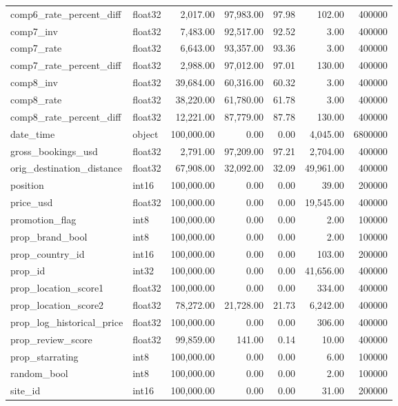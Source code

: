 \begin{table}
\begin{tabular}{llrrrrr}
comp6\_rate\_percent\_diff & float32 & 2,017.00 & 97,983.00 & 97.98 & 102.00 & 400000 \\
comp7\_inv & float32 & 7,483.00 & 92,517.00 & 92.52 & 3.00 & 400000 \\
comp7\_rate & float32 & 6,643.00 & 93,357.00 & 93.36 & 3.00 & 400000 \\
comp7\_rate\_percent\_diff & float32 & 2,988.00 & 97,012.00 & 97.01 & 130.00 & 400000 \\
comp8\_inv & float32 & 39,684.00 & 60,316.00 & 60.32 & 3.00 & 400000 \\
comp8\_rate & float32 & 38,220.00 & 61,780.00 & 61.78 & 3.00 & 400000 \\
comp8\_rate\_percent\_diff & float32 & 12,221.00 & 87,779.00 & 87.78 & 130.00 & 400000 \\
date\_time & object & 100,000.00 & 0.00 & 0.00 & 4,045.00 & 6800000 \\
gross\_bookings\_usd & float32 & 2,791.00 & 97,209.00 & 97.21 & 2,704.00 & 400000 \\
orig\_destination\_distance & float32 & 67,908.00 & 32,092.00 & 32.09 & 49,961.00 & 400000 \\
position & int16 & 100,000.00 & 0.00 & 0.00 & 39.00 & 200000 \\
price\_usd & float32 & 100,000.00 & 0.00 & 0.00 & 19,545.00 & 400000 \\
promotion\_flag & int8 & 100,000.00 & 0.00 & 0.00 & 2.00 & 100000 \\
prop\_brand\_bool & int8 & 100,000.00 & 0.00 & 0.00 & 2.00 & 100000 \\
prop\_country\_id & int16 & 100,000.00 & 0.00 & 0.00 & 103.00 & 200000 \\
prop\_id & int32 & 100,000.00 & 0.00 & 0.00 & 41,656.00 & 400000 \\
prop\_location\_score1 & float32 & 100,000.00 & 0.00 & 0.00 & 334.00 & 400000 \\
prop\_location\_score2 & float32 & 78,272.00 & 21,728.00 & 21.73 & 6,242.00 & 400000 \\
prop\_log\_historical\_price & float32 & 100,000.00 & 0.00 & 0.00 & 306.00 & 400000 \\
prop\_review\_score & float32 & 99,859.00 & 141.00 & 0.14 & 10.00 & 400000 \\
prop\_starrating & int8 & 100,000.00 & 0.00 & 0.00 & 6.00 & 100000 \\
random\_bool & int8 & 100,000.00 & 0.00 & 0.00 & 2.00 & 100000 \\
site\_id & int16 & 100,000.00 & 0.00 & 0.00 & 31.00 & 200000 \\

\end{tabular}
\end{table}
